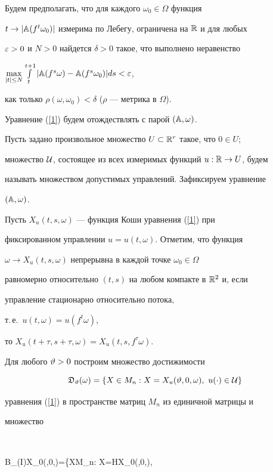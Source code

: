 Будем предполагать, что для каждого $\omega_0\in\Omega$ функция


$t\to|\Bbb A(f^t\omega_0)|$ измерима по Лебегу, ограничена на $\Bbb R$ и для любых


$\varepsilon>0$ и $N>0$ найдется $\delta>0$ такое, что выполнено неравенство


$\max\limits_{|t|\le N}\int\limits_t^{t+1}


|\A(f^s\omega)-\A(f^s\omega_0)|ds<\ve$,


как только $\rho(\omega,\omega_0)<\delta$ ($\rho$ --- метрика в $\Omega$).


Уравнение (\ref{1}) будем отождествлять с парой $(\Bbb A,\omega)$.





Пусть задано произвольное множество $U\subset\Bbb R^r$ такое, что $0\in U$;


множество $\cal U$, состоящее из всех измеримых функций $u:\Bbb R\to U$, будем


называть множеством допустимых управлений. Зафиксируем уравнение


$(\Bbb A,\omega)$.


Пусть $X_u(t,s,\omega)$ --- функция Коши уравнения (\ref{1}) при


фиксированном управлении $u=u(t,\omega)$.  Отметим, что функция


$\omega\to X_u(t,s,\omega)$ непрерывна в каждой точке $\omega_0\in\Omega$


равномерно относительно $(t,s)$ на любом компакте в $\Bbb R^2$ и, если


управление стационарно относительно потока,


т.\,е.~$u(t,\omega)=u(f^t\omega)$,


то $X_u(t+\tau,s+\tau,\omega)=X_u(t,s,f^{\tau}\omega)$.





Для любого $\vartheta>0$ построим множество достижимости


$$


\frak D_{\vt}(\omega)=\{X\in M_n: X=X_u(\vt,0,\omega),


\ u(\cdot)\in\cal U\}


$$


уравнения (\ref{1}) в пространстве матриц $M_n$ из единичной матрицы и


множество


$$


\cal B_{\ve}(I)X_0(\vt,0,\omega)=\{X\in M_n: X=HX_0(\vt,0,\omega),\


